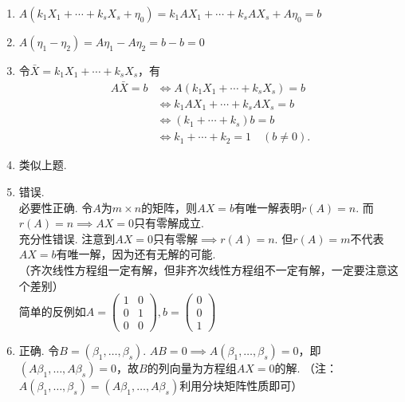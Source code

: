\begin{exercise}
\begin{exgroup}
\begin{answer}
\begin{enumerate}
                \item $A(k_1X_1+\cdots+k_sX_s+\eta_0)=k_1AX_1+\cdots+k_sAX_s+A\eta_0=b$

                \item $A(\eta_1-\eta_2)=A\eta_1-A\eta_2=b-b=0$

                \item 令$\bar{X}=k_1X_1+\cdots+k_sX_s$，有
                      \begin{align*}
                          A\bar{X}=b & \iff A(k_1X_1+\cdots+k_sX_s)=b        \\
                                     & \iff k_1AX_1+\cdots+k_sAX_s=b         \\
                                     & \iff (k_1+\cdots+k_s)b=b              \\
                                     & \iff k_1+\cdots+k_2=1\quad (b\neq 0).
                      \end{align*}

                \item 类似上题.

                \item 错误.\\
                      必要性正确. 令$A$为$m\times n$的矩阵，则$AX=b$有唯一解表明$r(A)=n$. 而$r(A)=n\implies AX=0$只有零解成立.\\
                      充分性错误. 注意到$AX=0$只有零解$\implies r(A)=n$. 但$r(A)=m$不代表$AX=b$有唯一解，因为还有无解的可能.\\
                      （齐次线性方程组一定有解，但非齐次线性方程组不一定有解，一定要注意这个差别）\\
                      简单的反例如$A=\begin{pmatrix}
                              1 & 0 \\
                              0 & 1 \\
                              0 & 0
                          \end{pmatrix},b=\begin{pmatrix}
                              0 \\
                              0 \\
                              1
                          \end{pmatrix}$

                \item 正确. 令$B=(\beta_1,\ldots,\beta_s)$. $AB=0\implies A(\beta_1,\ldots,\beta_s)=0$，即$(A\beta_1, \ldots, A\beta_s)=0$，故$B$的列向量为方程组$AX=0$的解. （注：$A(\beta_1,\ldots,\beta_s)=(A\beta_1, \ldots, A\beta_s)$利用分块矩阵性质即可）


\end{enumerate}
\end{answer}
\end{exgroup}
\end{exercise}
